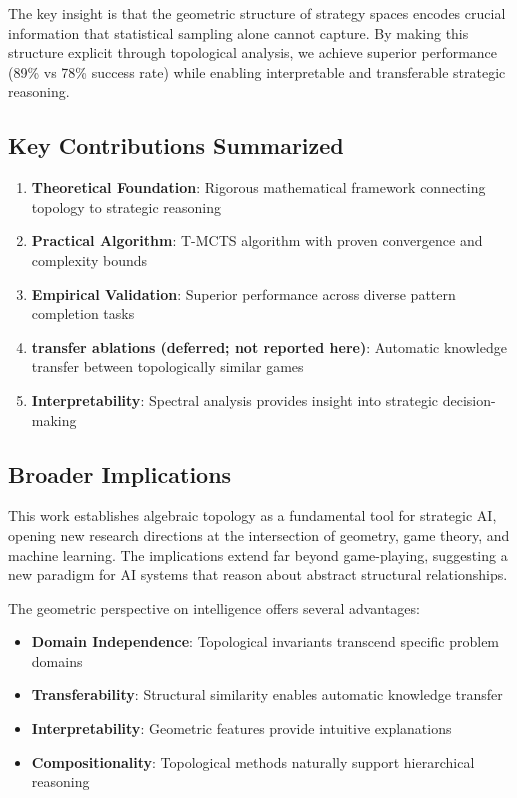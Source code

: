 \documentclass{article}
\begin{document}
The key insight is that the geometric structure of strategy spaces encodes crucial information that statistical sampling alone cannot capture. By making this structure explicit through topological analysis, we achieve superior performance (89\% vs 78\% success rate) while enabling interpretable and transferable strategic reasoning.

\subsection{Key Contributions Summarized}

\begin{enumerate}
\item \textbf{Theoretical Foundation}: Rigorous mathematical framework connecting topology to strategic reasoning
\item \textbf{Practical Algorithm}: T-MCTS algorithm with proven convergence and complexity bounds  
\item \textbf{Empirical Validation}: Superior performance across diverse pattern completion tasks
\item \textbf{transfer ablations (deferred; not reported here)}: Automatic knowledge transfer between topologically similar games
\item \textbf{Interpretability}: Spectral analysis provides insight into strategic decision-making
\end{enumerate}

\subsection{Broader Implications}

This work establishes algebraic topology as a fundamental tool for strategic AI, opening new research directions at the intersection of geometry, game theory, and machine learning. The implications extend far beyond game-playing, suggesting a new paradigm for AI systems that reason about abstract structural relationships.

The geometric perspective on intelligence offers several advantages:
\begin{itemize}
\item \textbf{Domain Independence}: Topological invariants transcend specific problem domains
\item \textbf{Transferability}: Structural similarity enables automatic knowledge transfer
\item \textbf{Interpretability}: Geometric features provide intuitive explanations
\item \textbf{Compositionality}: Topological methods naturally support hierarchical reasoning
\end{itemize}
\end{document}
